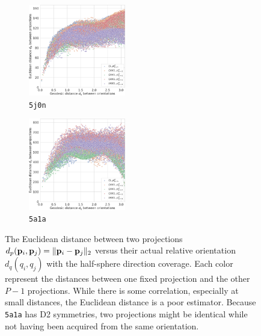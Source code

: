 \begin{figure}[ht!]
    \begin{minipage}[t]{0.52\linewidth}
        \begin{subfigure}[t]{0.48\textwidth}
            \centering
            \includegraphics[height=4cm]{figures/eucl_notrobust_5j0n}
            \caption{\texttt{5j0n}}
        \end{subfigure}
        \hfill
        \begin{subfigure}[t]{0.48\textwidth}
            \centering
            \includegraphics[height=4cm]{figures/eucl_notrobust_5a1a}
            \caption{\texttt{5a1a}}\label{fig:euclidean-not-robust:5a1a}
        \end{subfigure}
        \caption{%
            The Euclidean distance between two projections $d_p(\mathbf{p}_i, \mathbf{p}_j) = \Vert \mathbf{p}_i - \mathbf{p}_j \Vert_2$ versus their actual relative orientation $d_q(q_i, q_j)$ with the half-sphere direction coverage.
            Each color represent the distances between one fixed projection and the other $P-1$ projections.
            While there is some correlation, especially at small distances, the Euclidean distance is a poor estimator.
            Because \texttt{5a1a} has D2 symmetries, two projections might be identical while not having been acquired from the same orientation.
        }\label{fig:euclidean-not-robust}
    \end{minipage}

\end{figure}
